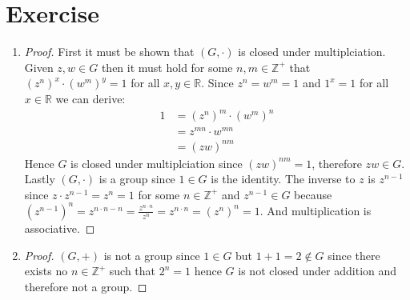 \documentclass{article}
\begin{document}
\section{Exercise}
\begin{enumerate}[label=(\alph*)]
    \item
    \begin{proof}
        First it must be shown that $(G, \cdot)$ is closed under
        multiplciation. Given $z, w \in G$ then it must hold for some $n, m \in
        \mathbb{Z}^+$ that $(z^n)^x \cdot (w^m)^y = 1$ for all $x, y \in
        \mathbb{R}$. Since $z^n = w^m = 1$ and $1^x = 1$ for all $x \in \mathbb{R}$
        we can derive:
        \begin{align*}
            1 &= \left(z^n\right)^m \cdot \left(w^m\right)^n \\
            &= z^{mn} \cdot w^{mn} \\
            &= \left(zw\right)^{nm} 
        \end{align*}
        Hence $G$ is closed under multiplciation since $\left(zw\right)^{nm} = 1$,
        therefore $zw \in G$. Lastly $(G, \cdot)$ is a group since $1 \in G$ is the
        identity. The inverse to $z$ is $z^{n - 1}$ since $z \cdot z^{n - 1} = z^n =
        1$ for some $n \in \mathbb{Z}^+$ and $z^{n - 1} \in G$ because $(z^{n -
        1})^n = z^{n \cdot n - n} = \frac{z^{n \cdot n}}{z^n} = z^{n \cdot n} =
        (z^{n})^n = 1$. And multiplication is associative.
    \end{proof}

    \item
    \begin{proof}
        $(G, +)$ is not a group since $1 \in G$ but $1 + 1 = 2 \notin G$
        since there exists no $n \in \mathbb{Z}^+$ such that $2^n = 1$ hence $G$ is
        not closed under addition and therefore not a group.
    \end{proof}
\end{enumerate}
\end{document}
